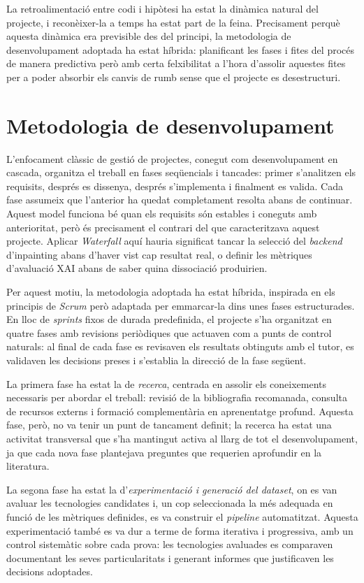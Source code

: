La retroalimentació entre codi i hipòtesi ha estat la dinàmica natural del projecte, i reconèixer-la a temps ha estat part de la feina. Precisament perquè aquesta dinàmica era previsible des del principi, la metodologia de desenvolupament adoptada ha estat híbrida: planificant les fases i fites del procés de manera predictiva però amb certa felxibilitat a l'hora d'assolir aquestes fites per a poder absorbir els canvis de rumb sense que el projecte es desestructuri.

\section{Metodologia de desenvolupament}

L'enfocament clàssic de gestió de projectes, conegut com desenvolupament en cascada, organitza el treball en fases seqüencials i tancades: primer s'analitzen els requisits, després es dissenya, després s'implementa i finalment es valida. Cada fase assumeix que l'anterior ha quedat completament resolta abans de continuar. Aquest model funciona bé quan els requisits són estables i coneguts amb anterioritat, però és precisament el contrari del que caracteritzava aquest projecte. Aplicar \emph{Waterfall} aquí hauria significat tancar la selecció del \emph{backend} d'inpainting abans d'haver vist cap resultat real, o definir les mètriques d'avaluació XAI abans de saber quina dissociació produirien.

Per aquest motiu, la metodologia adoptada ha estat híbrida, inspirada en els principis de \emph{Scrum} però adaptada per emmarcar-la dins unes fases  estructurades. En lloc de \emph{sprints} fixos de durada predefinida, el projecte s'ha organitzat en quatre fases amb revisions periòdiques que actuaven com a punts de control naturals: al final de cada fase es revisaven els resultats obtinguts amb el tutor, es validaven les decisions preses i s'establia la direcció de la fase següent.

La primera fase ha estat la de \emph{recerca}, centrada en assolir els coneixements necessaris per abordar el treball: revisió de la bibliografia recomanada, consulta de recursos externs i formació complementària en aprenentatge profund. Aquesta fase, però, no va tenir un punt de tancament definit; la recerca ha estat una activitat transversal que s'ha mantingut activa al llarg de tot el desenvolupament, ja que cada nova fase plantejava preguntes que requerien aprofundir en la literatura.

La segona fase ha estat la d'\emph{experimentació i generació del dataset}, on es van avaluar les tecnologies candidates i, un cop seleccionada la més adequada en funció de les mètriques definides, es va construir el \emph{pipeline} automatitzat. Aquesta experimentació també es va dur a terme de forma iterativa i progressiva, amb un control sistemàtic sobre cada prova: les tecnologies avaluades es comparaven documentant les seves particularitats i generant informes que justificaven les decisions adoptades.


